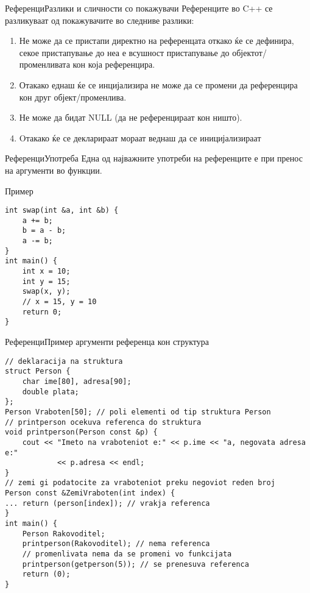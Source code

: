 \begin{frame}[fragile]{Референци}{Разлики и сличности со покажувачи}
Референците во C++ се разликуваат од покажувачите во следниве разлики:
\begin{enumerate}
  \item Не може да се пристапи директно на референцата откако ќе се дефинира,
  секое пристапување до неа е всушност пристапување до објектот/променливата кон
  која референцира.
  \item Отакако еднаш ќе се инцијализира не може да се промени да референцира
  кон друг објект/променлива.
  \item Не може да бидат NULL (да не референцираат кон ништо).
  \item Oтакако ќе се декларираат мораат веднаш да се иницијализираат
\end{enumerate}
\end{frame}

\begin{frame}[fragile]{Референци}{Употреба}
Една од најважните употреби на референците е при пренос на аргументи во функции.
\begin{exampleblock}{Пример}
\begin{lstlisting}
int swap(int &a, int &b) {
    a += b;
    b = a - b;
    a -= b;
}
int main() {
    int x = 10;
    int y = 15;
    swap(x, y);
    // x = 15, y = 10
    return 0;
}
\end{lstlisting}
\end{exampleblock}
\end{frame}

\begin{frame}[fragile]{Референци}{Пример аргументи референца кон структура}
\begin{lstlisting}
// deklaracija na struktura
struct Person {
    char ime[80], adresa[90];
    double plata;
};
Person Vraboten[50]; // poli elementi od tip struktura Person 
// printperson ocekuva referenca do struktura
void printperson(Person const &p) {
    cout << "Imeto na vraboteniot e:" << p.ime << "a, negovata adresa e:"
            << p.adresa << endl;
}
// zemi gi podatocite za vraboteniot preku negoviot reden broj
Person const &ZemiVraboten(int index) {
... return (person[index]); // vrakja referenca
}
int main() {
    Person Rakovoditel;
    printperson(Rakovoditel); // nema referenca
    // promenlivata nema da se promeni vo funkcijata
    printperson(getperson(5)); // se prenesuva referenca
    return (0);
}
\end{lstlisting}
\end{frame}


